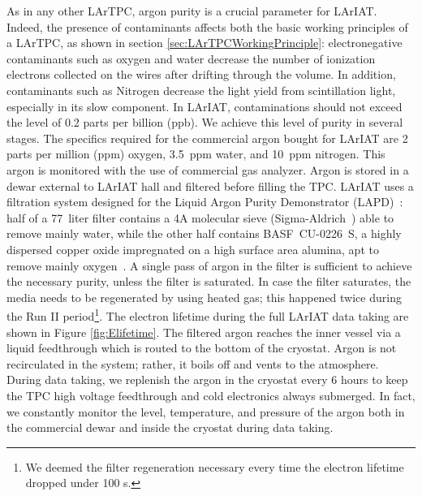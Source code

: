 As in any other LArTPC, argon purity is a crucial parameter for LArIAT. Indeed, the presence of contaminants affects both the basic working principles of a LArTPC, as shown in section \ref{sec:LArTPCWorkingPrinciple}: electronegative contaminants such as oxygen and water decrease the number of ionization electrons collected on the wires after drifting through the volume. In addition, contaminants such as Nitrogen decrease the light yield from scintillation light, especially in its slow component.
In LArIAT, contaminations should not exceed the level of 0.2 parts per billion (ppb). We achieve this level of purity in several stages. The specifics required for the commercial argon bought for LArIAT are 2 parts per million (ppm) oxygen, 3.5~ppm water, and 10~ppm nitrogen. This argon is monitored with the use of commercial gas analyzer.
Argon is stored in a dewar external to LArIAT hall and filtered before filling the TPC. %
LArIAT uses a filtration system designed for the Liquid Argon Purity Demonstrator (LAPD)~\cite{LAPD}: half of a 77~liter filter contains a 4A molecular sieve (Sigma-Aldrich~\cite{sigma-aldrich}) able to remove mainly water, while the other half contains BASF~CU-0226~S, a highly dispersed copper oxide impregnated on a high surface area alumina, apt to remove mainly oxygen~\cite{basf}. A single pass of argon in the filter is sufficient to achieve the necessary purity, unless the filter is saturated. In case the filter saturates, the media needs to be regenerated by using heated gas; this happened twice during the Run II period\footnote{We deemed the filter regeneration necessary every time the electron lifetime dropped under 100 \textmu s.}. The electron lifetime during the full LArIAT data taking are shown in Figure \ref{fig:Elifetime}.
The filtered argon reaches the inner vessel via a liquid feedthrough which is routed to the bottom of the cryostat. Argon is not recirculated in the system; rather, it boils off and vents to the atmosphere. During data taking, we replenish the argon in the cryostat every 6 hours to keep the TPC high voltage feedthrough and cold electronics always submerged. In fact, we constantly monitor the level, temperature, and pressure of the argon both in the commercial dewar and inside the cryostat during data taking. 

